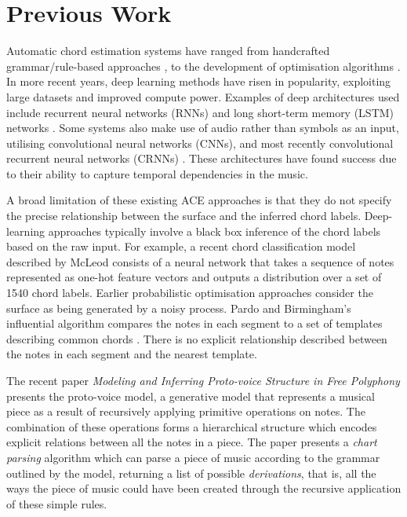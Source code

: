 \documentclass[12pt,a4paper,twoside,openany]{report} \usepackage[pdfborder={0 0 0}]{hyperref}    %
\theoremstyle{definition} \newtheorem{definition}{Definition}[section]
\begin{document}
    \section{Previous Work}

    Automatic chord estimation systems have ranged from handcrafted grammar/rule-based approaches
    \cite{maxwellExpertSystemHarmonizing1992} \cite{winogradLinguisticsComputerAnalysis1968}, to the
    development of optimisation algorithms \cite{pardoAlgorithmsChordalAnalysis2002}. 
    In more recent years, deep learning methods have risen in popularity, exploiting large datasets and improved compute
    power. Examples of deep architectures used include recurrent neural networks (RNNs)
    \cite{chenFunctionalHarmonyRecognition2018a} and long short-term memory (LSTM)
    networks \cite{dengLargeVocabularyAutomatic2018}. Some systems also make use of audio rather than symbols as an
    input, utilising
    convolutional neural networks (CNNs), and most recently convolutional recurrent neural networks (CRNNs)
    \cite{wuAutomaticChordEstimation2019} \cite{fardAutomaticChordRecognition2020}. These architectures have
    found success due to their ability to capture temporal dependencies in the music.

    A broad limitation of these existing ACE approaches is that they do not specify the precise relationship
    between the surface and the inferred chord labels. Deep-learning approaches
    typically involve a black box inference of the chord labels based on the raw input. For example, a recent chord classification model described by McLeod
    \cite{mcleodModularSystemHarmonic2021} consists of a neural network that takes a sequence of notes represented as
    one-hot feature vectors and outputs a distribution over a set of 1540 chord labels.
    Earlier probabilistic optimisation approaches consider the surface as being generated by a noisy process. Pardo and
    Birmingham's influential algorithm compares the notes in each segment to a set
    of templates describing common chords \cite{pardoAlgorithmsChordalAnalysis2002}. There is no explicit
    relationship described between the notes in each segment and the nearest template.

    The recent paper \textit{Modeling and Inferring Proto-voice Structure in Free
    Polyphony}\cite{finkensiepModelingInferringProtovoice2021} presents the proto-voice model, a generative model that
    represents a musical piece as a result of recursively applying primitive operations on notes. 
    The combination of these operations forms a hierarchical structure which encodes explicit relations
    between all the notes in a piece. 
    The paper presents a \textit{chart parsing} algorithm which can parse a piece of music according to the grammar
    outlined by the model, returning a list of possible
    \textit{derivations}, that is, all the ways the piece of music could have been created through the recursive application of these simple rules. 
\end{document}
